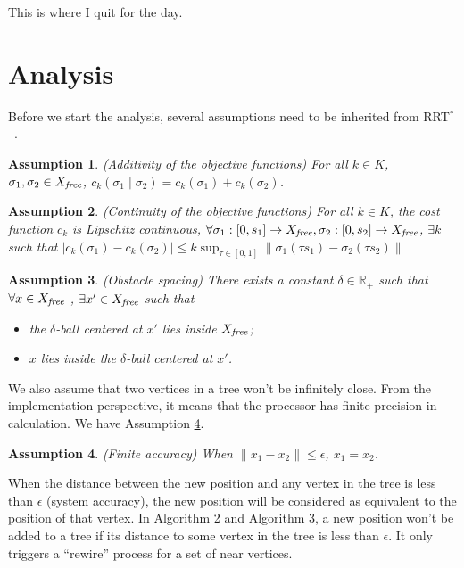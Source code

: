 \documentclass{article}
\newtheorem{asmp}{Assumption}
\begin{document}
{\sc This is where I quit for the day.}

\section{Analysis}
\label{sec:theoretic_analysis}

Before we start the analysis, several assumptions need to be inherited from  RRT$^{*}$~\cite{Karaman.Frazzoli:RSS10}.
\begin{asmp}{(Additivity of the objective functions)}
\label{asmp:additivity}	
For all $ k \in K $, $ \sigma_{1} , \sigma_{2} \in X_{\it free} $,
$ c_{k} ( \sigma_{1}  \mid \sigma_{2} ) = c_{k} ( \sigma_{1} ) + c_{k} ( \sigma_{2} ) $.
\end{asmp}

\begin{asmp}{(Continuity of the objective functions)}
\label{asmp:continuity}
For all $ k \in K $, the cost function $ c_{k} $ is Lipschitz continuous,
$ \forall \sigma_{1} : [ 0, s_{1} ] \rightarrow X_{\it free}, \sigma_{2} : [0, s_{2} ] \rightarrow X_{\it free} $,
$ \exists k $ such that 
$ | c_{k} ( \sigma_{1} ) - c_{k} ( \sigma_{2} ) | \leq k \sup_{\tau \in [0,1]} \lVert \sigma_{1} (\tau s_{1}) - \sigma_{2} (\tau s_{2}) \rVert $
\end{asmp}

\begin{asmp}{(Obstacle spacing)}
\label{asmp:spacing}
There exists a constant $ \delta \in \mathbb{R}_{+} $ such that $ \forall x \in X_{\it free} $ , $ \exists x' \in X_{\it free} $ such that
\begin{itemize}
\item the $ \delta $-ball centered at $ x' $ lies inside $ X_{\it free} $;
\item $ x $ lies inside the $ \delta $-ball centered at $ x' $.
\end{itemize}
\end{asmp}

We also assume that two vertices in a tree won't be infinitely close.
From the implementation perspective, it means that the processor has finite precision in calculation.
We have Assumption \ref{asmp:finite_accuracy}.
\begin{asmp}{(Finite accuracy)}
\label{asmp:finite_accuracy}
When $ \lVert x_{1} - x_{2} \rVert \leq \epsilon $, $ x_{1} = x_{2} $.
\end{asmp}
When the distance between the new position and any vertex in the tree is less than $ \epsilon $ (system accuracy), the new position will be considered as equivalent to the position of that vertex.
In Algorithm 2 and Algorithm 3, a new position won't be added to a tree if its distance to some vertex in the tree is less than $ \epsilon $.
It only triggers a ``rewire'' process for a set of near vertices.
\end{document}
